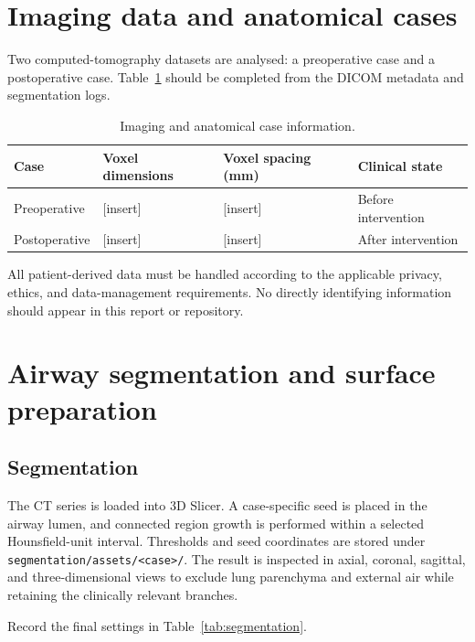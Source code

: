 \documentclass[11pt,a4paper]{article}
\begin{document}
\section{Imaging data and anatomical cases}
\label{sec:data}

Two computed-tomography datasets are analysed: a preoperative case and a
postoperative case. Table~\ref{tab:imaging} should be completed from the DICOM
metadata and segmentation logs.

\begin{table}[htbp]
  \centering
  \caption{Imaging and anatomical case information.}
  \label{tab:imaging}
  \begin{tabular}{@{}llll@{}}
    \toprule
    Case & Voxel dimensions & Voxel spacing (mm) & Clinical state \\
    \midrule
    Preoperative  & [insert] & [insert] & Before intervention \\
    Postoperative & [insert] & [insert] & After intervention \\
    \bottomrule
  \end{tabular}
\end{table}

All patient-derived data must be handled according to the applicable privacy,
ethics, and data-management requirements. No directly identifying information
should appear in this report or repository.

\section{Airway segmentation and surface preparation}
\label{sec:segmentation}

\subsection{Segmentation}

The CT series is loaded into 3D Slicer. A case-specific seed is placed in the
airway lumen, and connected region growth is performed within a selected
Hounsfield-unit interval. Thresholds and seed coordinates are stored under
\texttt{segmentation/assets/<case>/}. The result is inspected in axial,
coronal, sagittal, and three-dimensional views to exclude lung parenchyma and
external air while retaining the clinically relevant branches.

Record the final settings in Table~\ref{tab:segmentation}.
\end{document}
